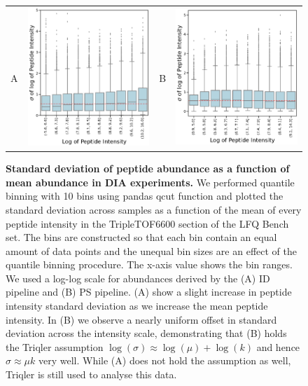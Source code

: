 \documentclass[11pt]{article}
\begin{document}
\begin{figure}[hbt]
    \centering
    \centering
    \begin{tabular}{lclc} 
        A & \includegraphics[width=0.4\linewidth]{../../result/report_plots_pipeline/quantile_bins_ID_median.png} &
        B & \includegraphics[width=0.4\linewidth]{../../result/report_plots_pipeline/quantile_bins_PS_median.png} \\
    \end{tabular}
  \caption{{\bf Standard deviation of peptide abundance as a function of mean abundance in DIA experiments.} We performed quantile binning with 10 bins using pandas qcut function and plotted the standard deviation across samples as a function of the mean of every peptide intensity in the TripleTOF6600 section of the LFQ Bench set. The bins are constructed so that each bin contain an equal amount of data points and the unequal bin sizes are an effect of the quantile binning procedure. The x-axis value shows the bin ranges. We used a log-log scale for abundances derived by the (A) ID pipeline and (B) PS pipeline. (A) show a slight increase in peptide intensity standard deviation as we increase the mean peptide intensity. In (B) we observe a nearly uniform offset in standard deviation across the intensity scale, demonstrating that (B) holds the Triqler assumption $\log(\sigma) \approx \log(\mu) + \log(k)$ and hence   $\sigma \approx \mu k$ very well. While (A) does not hold the assumption as well, Triqler is still used to analyse this data.  \label{fig:uniform_offset_in_standard_deviation_boxplot}}
 \end{figure}
\end{document}
